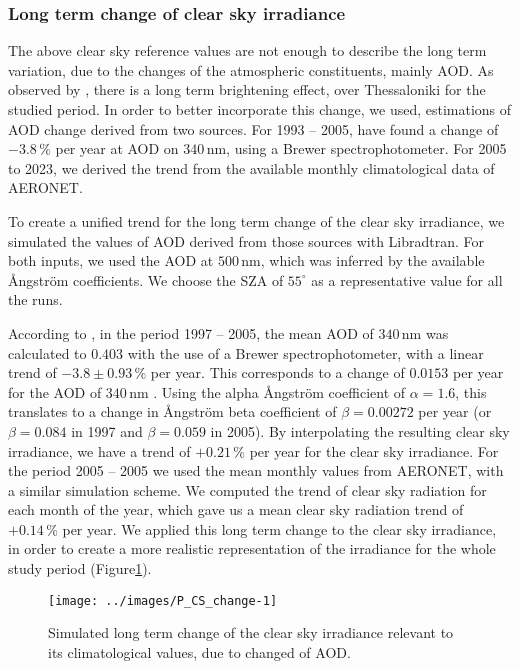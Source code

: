 \documentclass[preprint, 5p,
authoryear]{elsarticle} %
\begin{document}
\hypertarget{long-term-change-of-clear-sky-irradiance}{%
\subsubsection{Long term change of clear sky
irradiance}\label{long-term-change-of-clear-sky-irradiance}}

The above clear sky reference values are not enough to describe the long
term variation, due to the changes of the atmospheric constituents,
mainly AOD. As observed by \citet{Natsis2023}, there is a long term
brightening effect, over Thessaloniki for the studied period. In order
to better incorporate this change, we used, estimations of AOD change
derived from two sources. For 1993 -- 2005, \citet{Kazadzis2007} have
found a change of \(-3.8\,\%\) per year at AOD on \(340\,\text{nm}\),
using a Brewer spectrophotometer. For 2005 to 2023, we derived the trend
from the available monthly climatological data of AERONET.

To create a unified trend for the long term change of the clear sky
irradiance, we simulated the values of AOD derived from those sources
with Libradtran. For both inputs, we used the AOD at \(500\,\text{nm}\),
which was inferred by the available Ångström coefficients. We choose the
SZA of \(55^\circ\) as a representative value for all the runs.

According to \citet{Kazadzis2007}, in the period 1997 -- 2005, the mean
AOD of \(340\,\text{nm}\) was calculated to \(0.403\) with the use of a
Brewer spectrophotometer, with a linear trend of \(-3.8±0.93\,\%\) per
year. This corresponds to a change of \(0.0153\) per year for the AOD of
\(340\,\text{nm}\) . Using the alpha Ångström coefficient of
\(\alpha = 1.6\), this translates to a change in Ångström beta
coefficient of \(\beta=0.00272\) per year (or \(\beta=0.084\) in 1997
and \(\beta=0.059\) in 2005). By interpolating the resulting clear sky
irradiance, we have a trend of \(+0.21\,\%\) per year for the clear sky
irradiance. For the period 2005 -- 2005 we used the mean monthly values
from AERONET, with a similar simulation scheme. We computed the trend of
clear sky radiation for each month of the year, which gave us a mean
clear sky radiation trend of \(+0.14\,\%\) per year. We applied this
long term change to the clear sky irradiance, in order to create a more
realistic representation of the irradiance for the whole study period
(Figure\nobreakspace{}\ref{fig:CS-change}).

\begin{figure}

{\centering \texttt{[image: ../images/P\_CS\_change-1]} 

}

\caption{Simulated long term change of the clear sky irradiance relevant to its climatological values, due to changed of AOD.}\label{fig:CS-change}
\end{figure}
\end{document}
